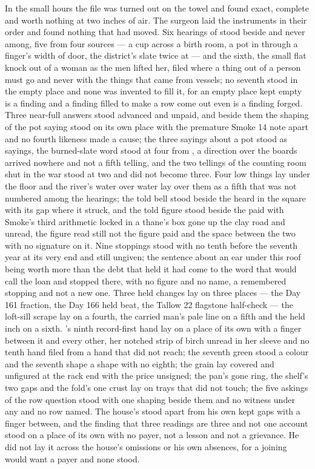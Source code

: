 In the small hours the file was turned out on the towel and found exact, complete and worth nothing at two inches of air. The surgeon laid the instruments in their order and found nothing that had moved. Six hearings of  stood beside and never among, five from four sources --- a cup across a birth room, a pot in  through a finger's width of door, the district's slate twice at  --- and the sixth, the small flat knock out of a woman as the men lifted her, filed where a thing out of a person must go and never with the things that came from vessels; no seventh stood in the empty place and none was invented to fill it, for an empty place kept empty is a finding and a finding filled to make a row come out even is a finding forged. Three near-full answers stood advanced and unpaid, and beside them the shaping of the pot saying stood on its own place with the premature Smoke 14 note apart and no fourth likeness made a cause; the three sayings about a pot stood as sayings, the burned-slate word stood at four from , a direction over the boards arrived nowhere and not a fifth telling, and the two tellings of the counting room shut in the war stood at two and did not become three. Four low things lay under the floor and the river's water over water lay over them as a fifth that was not numbered among the hearings; the told bell stood beside the heard in the square with its gap where it struck, and the told figure stood beside the paid with Smoke's third arithmetic locked in a thane's box gone up the clay road and unread, the figure read still not the figure paid and the space between the two with no signature on it. Nine stoppings stood with no tenth before the seventh year at its very end and still ungiven; the sentence about an ear under this roof being worth more than the debt that held it had come to the word that would call the loan and stopped there, with no figure and no name, a remembered stopping and not a new one. Three held changes lay on three places --- the Day 161 fraction, the Day 166 held beat, the Tallow 22 flagstone half-check --- the loft-sill scrape lay on a fourth, the carried man's pale line on a fifth and the held inch on a sixth. 's ninth record-first hand lay on a place of its own with a finger between it and every other, her notched strip of birch unread in her sleeve and no tenth hand filed from a hand that did not reach; the seventh green stood a colour and the seventh shape a shape with no eighth; the grain lay covered and unfigured at the rack end with the price unsigned; the pan's gone ring, the shelf's two gaps and the fold's one crust lay on trays that did not touch; the five askings of the row question stood with one shaping beside them and no witness under any and no row named. The house's  stood apart from his own kept gaps with a finger between, and the finding that three readings are three and not one account stood on a place of its own with no payer, not a lesson and not a grievance. He did not lay it across the house's omissions or his own absences, for a joining would want a payer and none stood.

